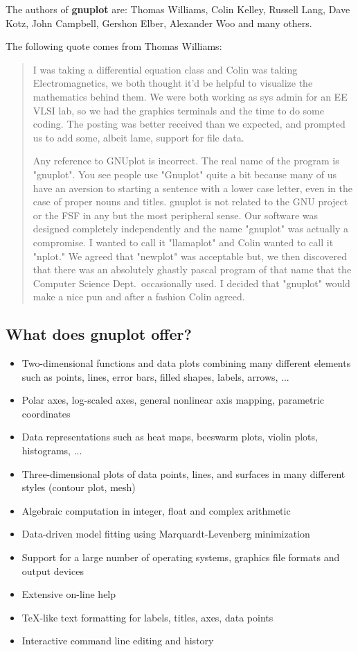 \documentclass[a4paper,11pt]{article}
\newcommand{\gnuplot}{\textbf{gnuplot }}
\begin{document}
The authors of \gnuplot are:
Thomas Williams, Colin Kelley, Russell Lang, Dave Kotz, John
Campbell, Gershon Elber, Alexander Woo and many others.

The following quote comes from Thomas Williams:
\begin{quote}
     I was taking a differential equation class and Colin was taking
     Electromagnetics, we both thought it'd be helpful to visualize the
     mathematics behind them. We were both working as sys admin for an
     EE VLSI lab, so we had the graphics terminals and the time to do
     some coding. The posting was better received than we expected, and
     prompted us to add some, albeit lame, support for file data.

     Any reference to GNUplot is incorrect. The real name of the program
     is "gnuplot". You see people use "Gnuplot" quite a bit because many
     of us have an aversion to starting a sentence with a lower case
     letter, even in the case of proper nouns and titles. gnuplot is not
     related to the GNU project or the FSF in any but the most
     peripheral sense. Our software was designed completely
     independently and the name "gnuplot" was actually a compromise. I
     wanted to call it "llamaplot" and Colin wanted to call it "nplot."
     We agreed that "newplot" was acceptable but, we then discovered
     that there was an absolutely ghastly pascal program of that name
     that the Computer Science Dept.\ occasionally used. I decided that
     "gnuplot" would make a nice pun and after a fashion Colin agreed.
\end{quote}


\subsection{What does \gnuplot offer?}

\begin{itemize}
\item Two-dimensional functions and data plots combining many different
elements such as points, lines, error bars, filled shapes, labels, arrows, ...
\item Polar axes, log-scaled axes, general nonlinear axis mapping, parametric coordinates
\item Data representations such as heat maps, beeswarm plots, violin plots, histograms, ...
\item Three-dimensional plots of data points, lines, and surfaces in
many different styles (contour plot, mesh)
\item Algebraic computation in integer, float and complex arithmetic
\item Data-driven model fitting using Marquardt-Levenberg minimization
\item Support for a large number of operating systems, graphics
file formats and output devices
\item Extensive on-line help
\item \TeX{}-like text formatting for labels, titles, axes, data points
\item Interactive command line editing and history
\end{itemize}
\end{document}
